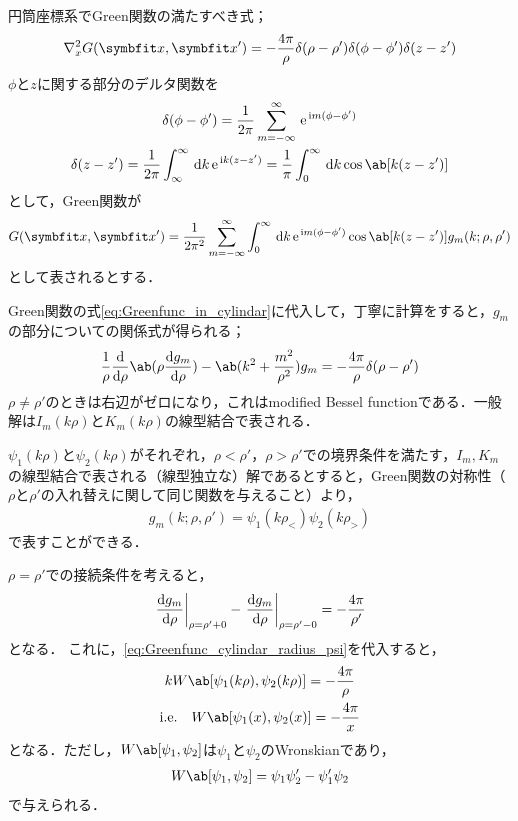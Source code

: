 円筒座標系でGreen関数の満たすべき式；
\begin{gather}
   \label{eq:Greenfunc_in_cylindar}
  \gr^2_x G(\bs{x}, \bs{x}') = -\frac{4\pi}{\rho} \delta(\rho - \rho') \delta(\phi - \phi') \delta (z - z')
\end{gather}
$\phi$と$z$に関する部分のデルタ関数を
\begin{gather}
  \delta(\phi - \phi') = \frac{1}{2\pi} \sum_{m=-\infty}^{\infty} \e^{\i m(\phi - \phi')}\\
\delta(z - z') = \frac{1}{2\pi} \int_\infty^\infty \dl{k} \e^{\i k(z-z')}  = \frac{1}{\pi} \int_0^\infty \dl{k}\cos\ab[k(z-z')]
\end{gather}
として，Green関数が
\begin{gather}  
  G(\bs{x}, \bs{x}') = \frac{1}{2\pi^2} \sum_{m=-\infty}^{\infty} \int_0^\infty \dl{k} \e^{\i m(\phi-\phi')} \cos \ab[k(z - z')] g_m(k; \rho, \rho')
\end{gather}
として表されるとする．

Green関数の式\eqref{eq:Greenfunc_in_cylindar}に代入して，丁寧に計算をすると，$g_m$の部分についての関係式が得られる；
\begin{gather}
  \label{eq:Greenfunc_cylindar_radius}
  \frac{1}{\rho} \diff**{\rho}{\ab(\rho\diff{g_m}{\rho})} - \ab(k^2 + \frac{m^2}{\rho^2})g_m = -\frac{4\pi}{\rho} \delta (\rho - \rho')
\end{gather}
$\rho \neq \rho'$のときは右辺がゼロになり，これはmodified Bessel functionである．一般解は$I_m(k\rho)$と$K_m(k\rho)$の線型結合で表される．

$\psi_1(k\rho)$と$\psi_2(k\rho)$がそれぞれ，$\rho < \rho'$，$\rho > \rho'$での境界条件を満たす，$I_m, K_m$の線型結合で表される（線型独立な）解であるとすると，Green関数の対称性（$\rho$と$\rho'$の入れ替えに関して同じ関数を与えること）より，
\begin{gather}
  \label{eq:Greenfunc_cylindar_radius_psi}
  g_m(k; \rho, \rho') = \psi_1(k\rho_<)\psi_2(k\rho_>)
\end{gather}
で表すことができる．

$\rho = \rho'$での接続条件を考えると，
\begin{gather}  
  \eval{\diff{g_m}{\rho}}_{\rho = \rho' +0} - \eval{\diff{g_m}{\rho}}_{\rho = \rho' - 0} = - \frac{4\pi}{\rho'}
\end{gather}
となる．
これに，\eqref{eq:Greenfunc_cylindar_radius_psi}を代入すると，
\begin{gather}
  k W\ab[\psi_1(k\rho), \psi_2(k\rho)] = -\frac{4\pi}{\rho} \\
  \label{eq:wronskian_cylindar}
  \text{i.e.}\qq W\ab[\psi_1(x), \psi_2(x)] = -\frac{4\pi}{x}
\end{gather}
となる．ただし，$W\ab[\psi_1, \psi_2]$は$\psi_1$と$\psi_2$のWronskianであり，
\begin{gather}
  W\ab[\psi_1, \psi_2] = \psi_1 \psi_2' - \psi_1'\psi_2
\end{gather}
で与えられる．

